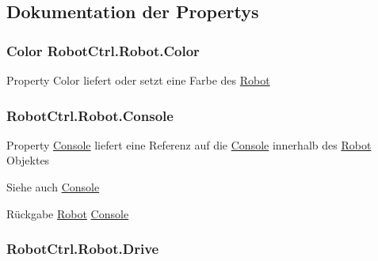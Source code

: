 \subsection{Dokumentation der Propertys}
\hypertarget{class_robot_ctrl_1_1_robot_a894338ff794429cdf09647ff8d73d83e}{
\subsubsection[{Color}]{\setlength{\rightskip}{0pt plus 5cm}Color RobotCtrl.Robot.Color}}
\label{class_robot_ctrl_1_1_robot_a894338ff794429cdf09647ff8d73d83e}
Property Color liefert oder setzt eine Farbe des \hyperlink{class_robot_ctrl_1_1_robot}{Robot} \hypertarget{class_robot_ctrl_1_1_robot_ae78d1691cc943383977741712962bf82}{
\subsubsection[{Console}]{ RobotCtrl.Robot.Console}}
\label{class_robot_ctrl_1_1_robot_ae78d1691cc943383977741712962bf82}
Property \hyperlink{class_robot_ctrl_1_1_console}{Console} liefert eine Referenz auf die \hyperlink{class_robot_ctrl_1_1_console}{Console} innerhalb des \hyperlink{class_robot_ctrl_1_1_robot}{Robot} Objektes \begin{DoxySeeAlso}{Siehe auch}
\hyperlink{class_robot_ctrl_1_1_console}{Console}
\end{DoxySeeAlso}
\begin{DoxyReturn}{Rückgabe}
\hyperlink{class_robot_ctrl_1_1_robot}{Robot} \hyperlink{class_robot_ctrl_1_1_console}{Console} 
\end{DoxyReturn}
\hypertarget{class_robot_ctrl_1_1_robot_a6e1e59f43f8578d78da6c6a19e55f269}{
\subsubsection[{Drive}]{ RobotCtrl.Robot.Drive}}
